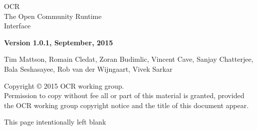 
\begin{titlepage}

  \begin{adjustwidth}{-0.75in}{0in}
    \begin{center}
      \Huge
      \textsf{OCR\\The Open Community Runtime \\Interface}

      \vspace{0.5in}\textsf{ }\vspace{-0.7in}
      \normalsize
      \vspace{1.0in}
      \textbf{Version 1.0.1, September, 2015}
      \vspace{1.0in}

Tim Mattson, Romain Cledat, Zoran Budimlic,
Vincent Cave, Sanjay Chatterjee, Bala Seshasayee, Rob van der Wijngaart,
Vivek Sarkar
    \end{center}
  \end{adjustwidth}
  \vspace{2.0in}

  \begin{adjustwidth}{0pt}{1em}\setlength{\parskip}{0.25\baselineskip}%
Copyright © 2015 OCR working group.\\
Permission to copy without fee all or part of this material is granted,
provided the OCR working group copyright notice and
the title of this document appear.
  \end{adjustwidth}
\end{titlepage}


\clearpage
\thispagestyle{empty}
\phantom{a}
This page intentionally left blank
\vfill
